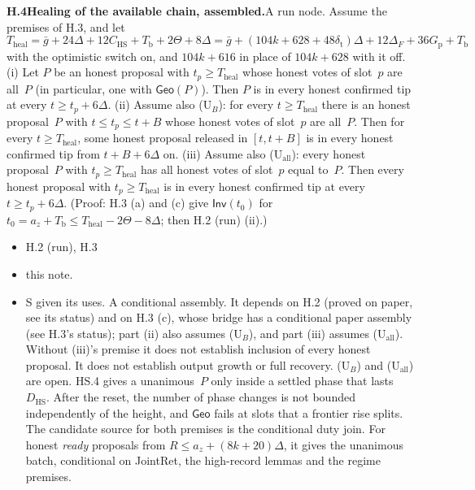 \documentclass{article}
\newcommand{\dagnode}[6]{%
\par\medskip\noindent\textbf{#1\enspace #2.}\enspace #3
\begin{itemize}[leftmargin=2.2em,itemsep=0pt,topsep=2pt]
\item[\emph{Uses}] #4
\item[\emph{Evid.}] #5
\item[\emph{Task}] #6
\end{itemize}}
\begin{document}
\dagnode{H.4}{Healing of the available chain, assembled}{A run node.
Assume the premises of H.3, and let
\[
T_{\mathrm{heal}}=\bar g+24\Delta+12C_{\mathrm{HS}}+T_{\mathrm b}+2\Theta+8\Delta
=\bar g+(104k+628+48\delta_{\mathrm t})\Delta+12\Delta_F+36G_{\mathrm p}
+T_{\mathrm b}
\]
with the optimistic switch on, and $104k+616$ in place of $104k+628$ with it off.
(i) Let $P$ be an honest proposal with $t_p\geq T_{\mathrm{heal}}$ whose
honest votes of slot~$p$ are all~$P$ (in particular, one with
$\mathsf{Geo}(P)$).  Then $P$ is in every honest confirmed tip at every
$t\geq t_p+6\Delta$.
(ii) Assume also ($\mathrm U_{B}$): for every $t\geq T_{\mathrm{heal}}$ there
is an honest proposal~$P$ with $t\leq t_p\leq t+B$ whose honest votes of
slot~$p$ are all~$P$.  Then for every $t\geq T_{\mathrm{heal}}$, some honest
proposal released in $[t,t+B]$ is in every honest confirmed tip from
$t+B+6\Delta$ on.
(iii) Assume also ($\mathrm U_{\mathrm{all}}$): every honest proposal~$P$
with $t_p\geq T_{\mathrm{heal}}$ has all honest votes of slot~$p$ equal
to~$P$.  Then every honest proposal with $t_p\geq T_{\mathrm{heal}}$ is in
every honest confirmed tip at every $t\geq t_p+6\Delta$.
(Proof: H.3 (a) and (c) give $\mathsf{Inv}(t_0)$ for
$t_0=a_z+T_{\mathrm b}\leq T_{\mathrm{heal}}-2\Theta-8\Delta$; then H.2 (run)
(ii).)}
{H.2 (run), H.3}
{this note.}
{S given its uses.  A conditional assembly.  It depends on H.2 (proved on
paper, see its status) and on H.3 (c), whose bridge has a conditional paper
assembly (see H.3's status); part (ii) also assumes ($\mathrm U_{B}$), and part (iii)
assumes ($\mathrm U_{\mathrm{all}}$).  Without (iii)'s premise it does not
establish inclusion of every honest proposal.  It does not establish output
growth or full recovery.
($\mathrm U_{B}$) and ($\mathrm U_{\mathrm{all}}$) are open.  HS.4 gives a
unanimous~$P$ only inside a settled phase that lasts $D_{\mathrm{HS}}$.
After the reset, the number of phase changes is not bounded independently of
the height, and $\mathsf{Geo}$ fails at
slots that a frontier rise splits.  The candidate source for both premises is
the conditional duty join.  For honest \emph{ready} proposals from
$R\leq a_z+(8k+20)\Delta$, it gives the unanimous batch, conditional on
JointRet, the high-record lemmas and the regime premises.}
\end{document}
